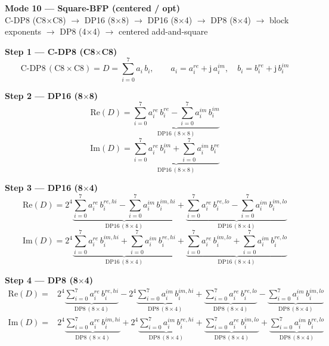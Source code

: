 \documentclass[fleqn]{article}
\newcommand{\DPop}[3]{\mathrm{DP#1}\,(#2\!\times\!#3)}
\begin{document}
\begin{center}
{\LARGE \textbf{Mode 10 --- Square-BFP (centered / opt)}}\\[4pt]
{\large C-DP8 (C8$\times$C8) $\rightarrow$ DP16 (8$\times$8) $\rightarrow$ DP16 (8$\times$4) $\rightarrow$ DP8 (8$\times$4) $\rightarrow$ block exponents $\rightarrow$ DP8 (4$\times$4) $\rightarrow$ centered add-and-square}
\end{center}

\vspace{0.1em}

\textbf{Step 1 --- C-DP8 (C8$\times$C8)}
\[
\text{C-DP8}\,(\mathrm{C8}\!\times\!\mathrm{C8}) = D = \sum_{i=0}^{7} a_i \, b_i, \qquad
a_i = a_i^{re} + \mathrm{j}\,a_i^{im}, \quad
b_i = b_i^{re} + \mathrm{j}\,b_i^{im}
\]

\textbf{Step 2 --- DP16 (8$\times$8)}
\[
\mathrm{Re}(D) = \underbrace{\sum_{i=0}^{7} a_i^{re}\, b_i^{re}
  - \sum_{i=0}^{7} a_i^{im}\, b_i^{im}}_{\DPop{16}{8}{8}}
\]
\[
\mathrm{Im}(D) = \underbrace{\sum_{i=0}^{7} a_i^{re}\, b_i^{im}
  + \sum_{i=0}^{7} a_i^{im}\, b_i^{re}}_{\DPop{16}{8}{8}}
\]

\textbf{Step 3 --- DP16 (8$\times$4)}
\[
\mathrm{Re}(D) = 2^{4}\underbrace{\sum_{i=0}^{7} a_i^{re}\, b_i^{re,hi}
  - \sum_{i=0}^{7} a_i^{im}\, b_i^{im,hi}}_{\DPop{16}{8}{4}}
  + \underbrace{\sum_{i=0}^{7} a_i^{re}\, b_i^{re,lo}
  - \sum_{i=0}^{7} a_i^{im}\, b_i^{im,lo}}_{\DPop{16}{8}{4}}
\]
\[
\mathrm{Im}(D) = 2^{4}\underbrace{\sum_{i=0}^{7} a_i^{re}\, b_i^{im,hi}
  + \sum_{i=0}^{7} a_i^{im}\, b_i^{re,hi}}_{\DPop{16}{8}{4}}
  + \underbrace{\sum_{i=0}^{7} a_i^{re}\, b_i^{im,lo}
  + \sum_{i=0}^{7} a_i^{im}\, b_i^{re,lo}}_{\DPop{16}{8}{4}}
\]

\textbf{Step 4 --- DP8 (8$\times$4)}
\begin{align*}
\mathrm{Re}(D) = {}
  & 2^{4}\underbrace{\sum_{i=0}^{7} a_i^{re}\, b_i^{re,hi}}_{\DPop{8}{8}{4}}
  - 2^{4}\underbrace{\sum_{i=0}^{7} a_i^{im}\, b_i^{im,hi}}_{\DPop{8}{8}{4}}
  + \underbrace{\sum_{i=0}^{7} a_i^{re}\, b_i^{re,lo}}_{\DPop{8}{8}{4}}
  - \underbrace{\sum_{i=0}^{7} a_i^{im}\, b_i^{im,lo}}_{\DPop{8}{8}{4}}
\end{align*}
\begin{align*}
\mathrm{Im}(D) = {}
  & 2^{4}\underbrace{\sum_{i=0}^{7} a_i^{re}\, b_i^{im,hi}}_{\DPop{8}{8}{4}}
  + 2^{4}\underbrace{\sum_{i=0}^{7} a_i^{im}\, b_i^{re,hi}}_{\DPop{8}{8}{4}}
  + \underbrace{\sum_{i=0}^{7} a_i^{re}\, b_i^{im,lo}}_{\DPop{8}{8}{4}}
  + \underbrace{\sum_{i=0}^{7} a_i^{im}\, b_i^{re,lo}}_{\DPop{8}{8}{4}}
\end{align*}
\end{document}
